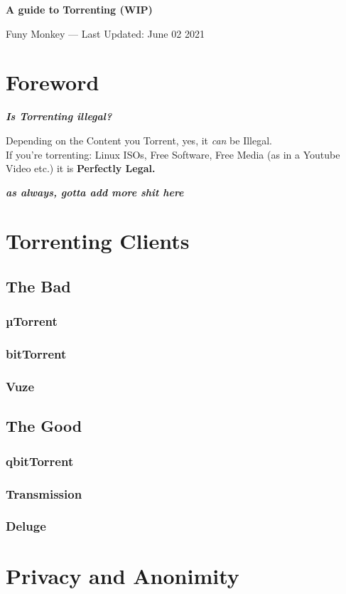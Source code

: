 \documentclass{article}
\renewcommand{\maketitle}{
	\begin{center}
		{\huge\bfseries
		A guide to Torrenting (WIP)}
		\vspace{.25em}

		Funy Monkey --- Last Updated: June 02 2021
	\end{center}
}
\begin{document}
\maketitle
\tableofcontents

\section{Foreword}
	\textbf{\textit{Is Torrenting illegal?}}

	Depending on the Content you Torrent, yes, it \textit{can} be Illegal. \\
	If you're torrenting: Linux ISOs, Free Software, Free Media (as in a Youtube Video etc.) it is \textbf{Perfectly Legal.}
	
	\textbf{\textit{as always, gotta add more shit here}}
\section{Torrenting Clients}
	\subsection{The Bad}
		\subsubsection{µTorrent}
		\subsubsection{bitTorrent}
		\subsubsection{Vuze}
	\subsection{The Good}
		\subsubsection{qbitTorrent}
		\subsubsection{Transmission}
		\subsubsection{Deluge}
\section{Privacy and Anonimity}
\end{document}
